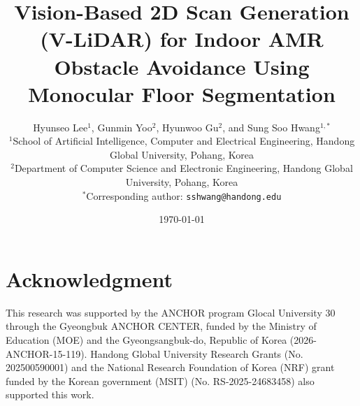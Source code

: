 \documentclass[10pt,twocolumn,a4paper]{article}
\title{\textbf{Vision-Based 2D Scan Generation (V-LiDAR) for Indoor AMR Obstacle Avoidance Using Monocular Floor Segmentation}}
\author{
    Hyunseo Lee$^{1}$, Gunmin Yoo$^{2}$, Hyunwoo Gu$^{2}$, and Sung Soo Hwang$^{1,*}$\\[1ex]
    $^{1}$School of Artificial Intelligence, Computer and Electrical Engineering, Handong Global University, Pohang, Korea\\
    $^{2}$Department of Computer Science and Electronic Engineering, Handong Global University, Pohang, Korea\\
    $^{*}$Corresponding author: \texttt{sshwang@handong.edu}
}
\date{\today}
\begin{document}
\maketitle









\section*{Acknowledgment}
This research was supported by the ANCHOR program Glocal University 30 through the Gyeongbuk ANCHOR CENTER, funded by the Ministry of Education (MOE) and the Gyeongsangbuk-do, Republic of Korea (2026-ANCHOR-15-119). Handong Global University Research Grants (No. 202500590001) and the National Research Foundation of Korea (NRF) grant funded by the Korean government (MSIT) (No. RS-2025-24683458) also supported this work.



\end{document}
